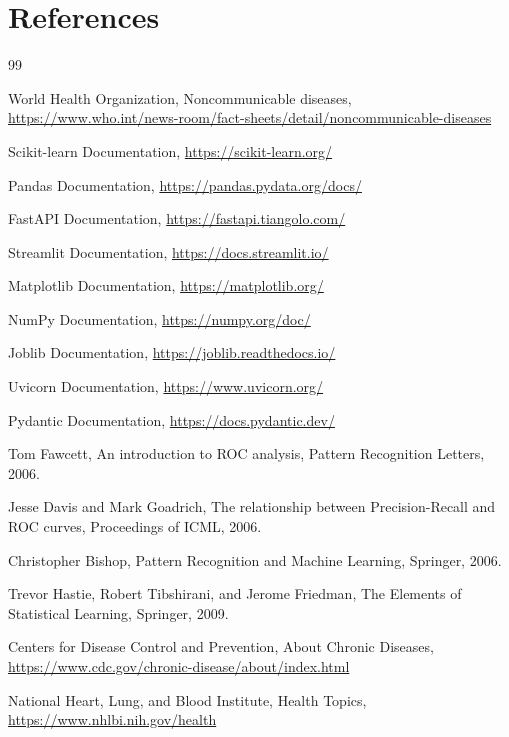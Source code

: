 \documentclass[12pt,a4paper,openany]{report}
\begin{document}
    \chapter{References}
    \begin{thebibliography}{99}

    World Health Organization,
    Noncommunicable diseases,
    \url{https://www.who.int/news-room/fact-sheets/detail/noncommunicable-diseases}

    Scikit-learn Documentation,
    \url{https://scikit-learn.org/}

    Pandas Documentation,
    \url{https://pandas.pydata.org/docs/}

    FastAPI Documentation,
    \url{https://fastapi.tiangolo.com/}

    Streamlit Documentation,
    \url{https://docs.streamlit.io/}

    Matplotlib Documentation,
    \url{https://matplotlib.org/}

    NumPy Documentation,
    \url{https://numpy.org/doc/}

    Joblib Documentation,
    \url{https://joblib.readthedocs.io/}

    Uvicorn Documentation,
    \url{https://www.uvicorn.org/}

    Pydantic Documentation,
    \url{https://docs.pydantic.dev/}

    Tom Fawcett,
    An introduction to ROC analysis,
    Pattern Recognition Letters, 2006.

    Jesse Davis and Mark Goadrich,
    The relationship between Precision-Recall and ROC curves,
    Proceedings of ICML, 2006.

    Christopher Bishop,
    Pattern Recognition and Machine Learning,
    Springer, 2006.

    Trevor Hastie, Robert Tibshirani, and Jerome Friedman,
    The Elements of Statistical Learning,
    Springer, 2009.

    Centers for Disease Control and Prevention,
    About Chronic Diseases,
    \url{https://www.cdc.gov/chronic-disease/about/index.html}

    National Heart, Lung, and Blood Institute,
    Health Topics,
    \url{https://www.nhlbi.nih.gov/health}


\end{thebibliography}
\end{document}
